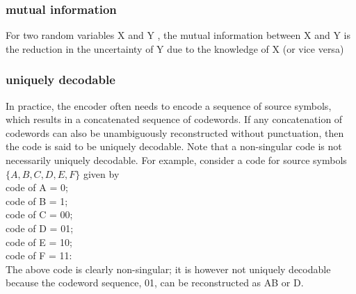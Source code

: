 \documentclass[a4]{beamer}
\begin{document}
\begin{frame}
\frametitle{mutual information}
For two random variables X and Y , the mutual information between X and
Y is the reduction in the uncertainty of Y due to the knowledge of X (or vice
versa)
\end{frame}

\begin{frame}
\frametitle{uniquely decodable}
In practice, the encoder often needs to encode a sequence of source symbols,
which results in a concatenated sequence of codewords. If any concatenation of
codewords can also be unambiguously reconstructed without punctuation, then
the code is said to be uniquely decodable. Note that a non-singular code is not
necessarily uniquely decodable. For example, consider a code for source symbols
$\{A,B,C,D,E, F \}$ given by\\
code of A = 0;\\
code of B = 1;\\
code of C = 00;\\
code of D = 01;\\
code of E = 10;\\
code of F = 11:\\
The above code is clearly non-singular; it is however not uniquely decodable
because the codeword sequence, 01, can be reconstructed as AB or D.
\end{frame}
\end{document}
